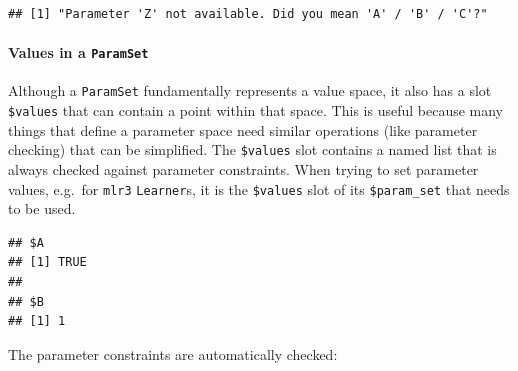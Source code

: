 \documentclass[]{scrbook}
\newenvironment{Shaded}{\begin{snugshade}}{\end{snugshade}}
\newcommand{\DataTypeTok}[1]{\textcolor[rgb]{0.13,0.29,0.53}{#1}}
\newcommand{\DecValTok}[1]{\textcolor[rgb]{0.00,0.00,0.81}{#1}}
\newcommand{\KeywordTok}[1]{\textcolor[rgb]{0.13,0.29,0.53}{\textbf{#1}}}
\newcommand{\NormalTok}[1]{#1}
\newcommand{\OperatorTok}[1]{\textcolor[rgb]{0.81,0.36,0.00}{\textbf{#1}}}
\newcommand{\OtherTok}[1]{\textcolor[rgb]{0.56,0.35,0.01}{#1}}
\newcommand{\StringTok}[1]{\textcolor[rgb]{0.31,0.60,0.02}{#1}}
\let\oldparagraph\paragraph
\renewcommand{\paragraph}[1]{\oldparagraph{#1}\mbox{}}
\renewenvironment{Shaded} {\begin{snugshade}\small} {\end{snugshade}}
\begin{document}
\begin{Shaded}
\end{Shaded}

\begin{verbatim}
## [1] "Parameter 'Z' not available. Did you mean 'A' / 'B' / 'C'?"
\end{verbatim}

\hypertarget{values-in-a-paramset}{%
\paragraph{\texorpdfstring{Values in a \texttt{ParamSet}}{Values in a ParamSet}}\label{values-in-a-paramset}}

Although a \texttt{ParamSet} fundamentally represents a value space, it also has a slot \texttt{\$values} that can contain a point within that space.
This is useful because many things that define a parameter space need similar operations (like parameter checking) that can be simplified.
The \texttt{\$values} slot contains a named list that is always checked against parameter constraints.
When trying to set parameter values, e.g.~for \texttt{mlr3} \texttt{Learner}s, it is the \texttt{\$values} slot of its \texttt{\$param\_set} that needs to be used.

\begin{Shaded}
\end{Shaded}

\begin{verbatim}
## $A
## [1] TRUE
## 
## $B
## [1] 1
\end{verbatim}

The parameter constraints are automatically checked:

\begin{Shaded}
\end{Shaded}
\end{document}
